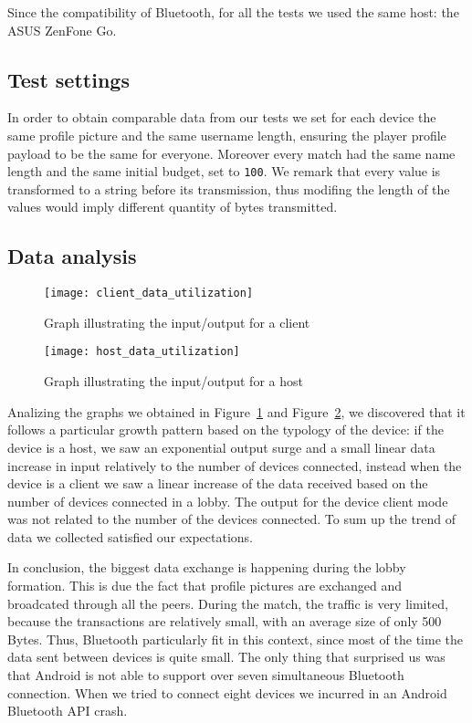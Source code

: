 Since the compatibility of Bluetooth, for all the tests we used the same host: 
the ASUS ZenFone Go.

\subsection{Test settings}

In order to obtain comparable data from our tests we set for each device 
the same profile picture and the same username length, ensuring the player 
profile payload to be the same for everyone. Moreover every match had the same 
name length and the same initial budget, set to \texttt{100}. We remark 
that every value is transformed to a string before its transmission, thus
modifing the length of the values would imply different quantity of bytes 
transmitted.

\subsection{Data analysis}
\begin{figure}[t]
 \centering
 \texttt{[image: client\_data\_utilization]}
 \caption{Graph illustrating the input/output for a client}
 \label{fig:res:cdu}
\end{figure}

\begin{figure}[t]
 \centering
 \texttt{[image: host\_data\_utilization]}
 \caption{Graph illustrating the input/output for a host}
 \label{fig:res:hdu}
\end{figure}

Analizing the graphs we obtained in Figure~\ref{fig:res:cdu} and 
Figure~\ref{fig:res:hdu}, we discovered that it follows a particular growth 
pattern based on the typology of the device: if the device is a host, we saw an 
exponential output surge and a small linear data increase in input relatively 
to the number of devices connected, instead when the device is a client we saw a 
linear increase of the data received based on the number of devices connected in 
a lobby. The output for the device client mode was not related to the number of 
the devices connected. To sum up the trend of data we collected satisfied our 
expectations.

In conclusion, the biggest data exchange is happening during the lobby 
formation. This is due the fact that profile pictures are exchanged and 
broadcated through all the peers. During the match, the traffic is very 
limited, because the transactions are relatively small, with an average size of 
only 500 Bytes. Thus, Bluetooth particularly fit in this context, since most of 
the time the data sent between devices is quite small.
The only thing that surprised us was that Android is not able to support over 
seven simultaneous Bluetooth connection. When we tried to connect eight devices 
we incurred in an Android Bluetooth API crash.
